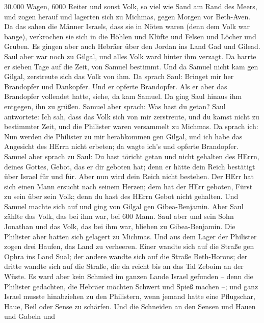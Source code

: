 30.000 Wagen, 6000 Reiter und sonst Volk, so viel wie Sand am Rand des
Meers, und zogen herauf und lagerten sich zu Michmas, gegen Morgen vor
Beth-Aven.  Da das sahen die Männer Israels, dass sie in
Nöten waren (denn dem Volk war bange), verkrochen sie sich in die Höhlen
und Klüfte und Felsen und Löcher und Gruben.  Es gingen aber
auch Hebräer über den Jordan ins Land Gad und Gilead. Saul aber war noch
zu Gilgal, und alles Volk ward hinter ihm verzagt.  Da
harrte er sieben Tage auf die Zeit, von Samuel bestimmt. Und da Samuel
nicht kam gen Gilgal, zerstreute sich das Volk von ihm.  Da
sprach Saul: Bringet mir her Brandopfer und Dankopfer. Und er opferte
Brandopfer.  Als er aber das Brandopfer vollendet hatte,
siehe, da kam Samuel. Da ging Saul hinaus ihm entgegen, ihn zu grüßen.
 Samuel aber sprach: Was hast du getan? Saul antwortete:
Ich sah, dass das Volk sich von mir zerstreute, und du kamst nicht zu
bestimmter Zeit, und die Philister waren versammelt zu Michmas.
 Da sprach ich: Nun werden die Philister zu mir herabkommen
gen Gilgal, und ich habe das Angesicht des HErrn nicht erbeten; da wagte
ich's und opferte Brandopfer.  Samuel aber sprach zu Saul:
Du hast töricht getan und nicht gehalten des HErrn, deines Gottes,
Gebot, das er dir geboten hat; denn er hätte dein Reich bestätigt über
Israel für und für.  Aber nun wird dein Reich nicht
bestehen. Der HErr hat sich einen Mann ersucht nach seinem Herzen; dem
hat der HErr geboten, Fürst zu sein über sein Volk; denn du hast des
HErrn Gebot nicht gehalten.  Und Samuel machte sich auf und
ging von Gilgal gen Gibea-Benjamin. Aber Saul zählte das Volk, das bei
ihm war, bei 600 Mann.  Saul aber und sein Sohn Jonathan
und das Volk, das bei ihm war, blieben zu Gibea-Benjamin. Die Philister
aber hatten sich gelagert zu Michmas.  Und aus dem Lager
der Philister zogen drei Haufen, das Land zu verheeren. Einer wandte
sich auf die Straße gen Ophra ins Land Sual;  der andere
wandte sich auf die Straße Beth-Horons; der dritte wandte sich auf die
Straße, die da reicht bis an das Tal Zeboim an der Wüste. 
Es ward aber kein Schmied im ganzen Lande Israel gefunden -- denn die
Philister gedachten, die Hebräer möchten Schwert und Spieß machen --;
 und ganz Israel musste hinabziehen zu den Philistern, wenn
jemand hatte eine Pflugschar, Haue, Beil oder Sense zu schärfen.
 Und die Schneiden an den Sensen und Hauen und Gabeln und
